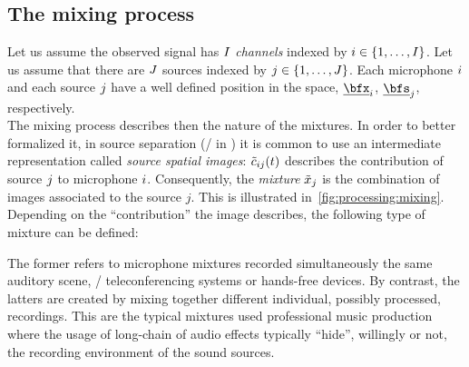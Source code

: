 \subsection{The mixing process}\label{subsec:processing:mixing}
Let us assume the observed signal has $I$ \textit{channels} indexed by $\idxMic \in \kbrace{1,\dots,\numMics}$.
Let us assume that there are $J$ sources indexed by $\idxSrc \in \kbrace{1,\dots,\numSrcs}$.
Each microphone $i$ and each source $j$ have a well defined position in the space, $\positionMicrophone_\idxMic$, $\positionSource_\idxSrc$, respectively.
\\The mixing process describes then the nature of the mixtures.
In order to better formalized it, in source separation (\eg/ in ) it is common to use an intermediate representation called \emph{source spatial images}:
$\tilde{c}_{ij}(t)$ describes the contribution of source $j$ to microphone $i$.
Consequently, the \textit{mixture} $\tilde{x}_{j}$ is the combination of images associated to the source $j$.
This is illustrated in~\cref{fig:processing:mixing}.
Depending on the ``contribution'' the image describes, the following type of mixture can be defined:

The former refers to microphone mixtures recorded simultaneously the same auditory scene, \eg/ teleconferencing systems or hands-free devices.
By contrast, the latters are created by mixing together different individual, possibly processed, recordings.
This are the typical mixtures used professional music production where the usage of long-chain of audio effects typically ``hide'', willingly or not, the recording environment of the sound sources.

